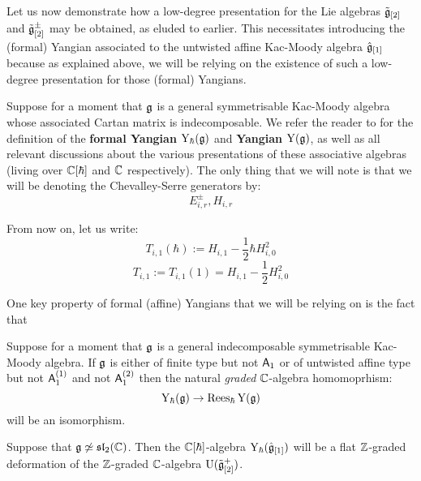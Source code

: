         Let us now demonstrate how a low-degree presentation for the Lie algebras $\tilde{\mathfrak{g}}_{[2]}$ and $\tilde{\mathfrak{g}}_{[2]}^{\pm}$ may be obtained, as eluded to earlier. This necessitates introducing the (formal) Yangian associated to the untwisted affine Kac-Moody algebra $\hat{\mathfrak{g}}_{[1]}$ because as explained above, we will be relying on the existence of such a low-degree presentation for those (formal) Yangians.
        \begin{convention}
            Suppose for a moment that $\mathfrak{g}$ is a general symmetrisable Kac-Moody algebra whose associated Cartan matrix is indecomposable. We refer the reader to \cite[Section 2]{guay_nakajima_wendlandt_affine_yangian_coproduct} for the definition of the \textbf{formal Yangian} $\mathrm{Y}_{\hbar}(\mathfrak{g})$ and \textbf{Yangian} $\mathrm{Y}(\mathfrak{g})$, as well as all relevant discussions about the various  presentations of these associative algebras (living over $\mathbb{C}[\hbar]$ and $\mathbb{C}$ respectively). The only thing that we will note is that we will be denoting the Chevalley-Serre generators by:
                $$E_{i, r}^{\pm}, H_{i, r}$$
        \end{convention}
        \begin{convention}
            From now on, let us write:
                $$T_{i, 1}(\hbar) := H_{i, 1} - \frac12 \hbar H_{i, 0}^2$$
                $$T_{i, 1} := T_{i, 1}(1) = H_{i, 1} - \frac12 H_{i, 0}^2$$
        \end{convention}

        One key property of formal (affine) Yangians that we will be relying on is the fact that 
        \begin{lemma} \label{lemma: formal_yangians_as_rees_algebras}
            \cite[Theorem 6.10]{guay_nakajima_wendlandt_affine_yangian_vertex_representations_and_PBW} Suppose for a moment that $\mathfrak{g}$ is a general indecomposable symmetrisable Kac-Moody algebra. If $\mathfrak{g}$ is either of finite type but not $\mathsf{A}_1$ or of untwisted affine type but not $\mathsf{A}_1^{(1)}$ and not $\mathsf{A}_1^{(2)}$ then the natural \textit{graded} $\mathbb{C}$-algebra homomoprhism:
                $$\mathrm{Y}_{\hbar}(\mathfrak{g}) \to \operatorname{Rees}_{\hbar} \mathrm{Y}(\mathfrak{g})$$
            will be an isomorphism. 
        \end{lemma}
         \begin{corollary} \label{coro: formal_affine_yangians_as_flat_graded_deformations}
            Suppose that $\mathfrak{g} \not \simeq \mathfrak{sl}_2(\mathbb{C})$. Then the $\mathbb{C}[\hbar]$-algebra $\mathrm{Y}_{\hbar}(\hat{\mathfrak{g}}_{[1]})$ will be a flat $\mathbb{Z}$-graded deformation of the $\mathbb{Z}$-graded $\mathbb{C}$-algebra $\mathrm{U}(\tilde{\mathfrak{g}}_{[2]}^+)$. 
         \end{corollary}
         
